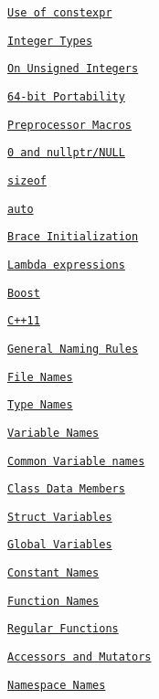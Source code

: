 \begin{DoxyItemize}
\begin{DoxyItemize}
\item \href{#use-of-constexpr-1}{\tt Use of constexpr}
\item \href{#integer-types}{\tt Integer Types}
\begin{DoxyItemize}
\item \href{#on-unsigned-integers}{\tt On Unsigned Integers}
\end{DoxyItemize}
\item \href{#64-bit-portability}{\tt 64-\/bit Portability}
\item \href{#preprocessor-macros}{\tt Preprocessor Macros}
\item \href{#0-and-nullptrnull}{\tt 0 and nullptr/\+N\+U\+LL}
\item \href{#sizeof}{\tt sizeof}
\item \href{#auto}{\tt auto}
\item \href{#brace-initialization}{\tt Brace Initialization}
\item \href{#lambda-expressions}{\tt Lambda expressions}
\item \href{#boost}{\tt Boost}
\item \href{#c11}{\tt C++11}
\item \href{#general-naming-rules}{\tt General Naming Rules}
\item \href{#file-names}{\tt File Names}
\item \href{#type-names}{\tt Type Names}
\item \href{#variable-names}{\tt Variable Names}
\begin{DoxyItemize}
\item \href{#common-variable-names}{\tt Common Variable names}
\item \href{#class-data-members}{\tt Class Data Members}
\item \href{#struct-variables}{\tt Struct Variables}
\item \href{#global-variables}{\tt Global Variables}
\end{DoxyItemize}
\item \href{#constant-names}{\tt Constant Names}
\item \href{#function-names}{\tt Function Names}
\begin{DoxyItemize}
\item \href{#regular-functions}{\tt Regular Functions}
\item \href{#accessors-and-mutators}{\tt Accessors and Mutators}
\end{DoxyItemize}
\item \href{#namespace-names}{\tt Namespace Names}

\end{DoxyItemize}
\end{DoxyItemize}
